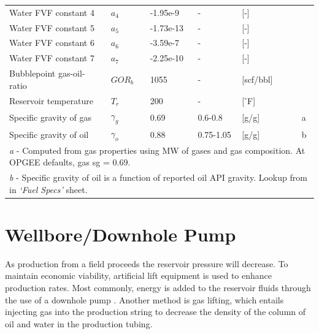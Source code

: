 \documentclass[11pt]{report}
\newcommand{\sheet}[1]{\textit{`{#1}'}}
\begin{document}
\begin{table}
\begin{scriptsize}
\begin{tabularx}{1\columnwidth}{p{}p{}p{}p{}p{}p{}p{}}
Water FVF constant 4				&	$a_4$			& -1.95e-9		& - 			&  [-] 	& \cite{McCain1990}				& \\
Water FVF constant 5				&	$a_5$			& -1.73e-13	& - 			&  [-] 	& \cite{McCain1990} 				& \\
Water FVF constant 6				&	$a_6$			& -3.59e-7 	& - 			&  [-] 	& \cite{McCain1990} 				& \\
Water FVF constant 7				&	$a_7$			& -2.25e-10 	& - 			&  [-] 	& \cite{McCain1990} 				& \\
Bubblepoint gas-oil-ratio 				&	$GOR_b$			& 1055 		& -			& [scf/bbl] & \cite{Valko2003} 				& \\
Reservoir temperature				& 	$T_r$			& 200 		& -			& [$^\circ$F] & 							& \\
Specific gravity of gas				&	$\gamma_g$ 	 	& 0.69		& 0.6-0.8 		& [g/g] 	&  & 							a \\
Specific gravity of oil					&	$\gamma_o$ 	 	& 0.88 		& 0.75-1.05	& [g/g] 	& \cite{Scmidth1985} 			& b \\
\midrule
\multicolumn{7}{p{1\columnwidth}}{\emph{a} - Computed from gas properties using MW of gases and gas composition. At OPGEE defaults, gas sg = 0.69.}\\
\multicolumn{7}{p{1\columnwidth}}{\emph{b} - Specific gravity of oil is a function of reported oil API gravity. Lookup from \cite{Schmidt1985} in \sheet{Fuel Specs} sheet.}\\
\bottomrule
\end{tabularx}
\end{scriptsize}
\end{table}









\clearpage

\section{Wellbore/Downhole Pump}

As production from a field proceeds the reservoir pressure will decrease. To maintain economic viability, artificial lift equipment is used to enhance production rates. Most commonly, energy is added to the reservoir fluids through the use of a downhole pump \cite[p. 2]{Takacs2005}. Another method is gas lifting, which entails injecting gas into the production string to decrease the density of the column of oil and water in the production tubing. 
\end{document}
